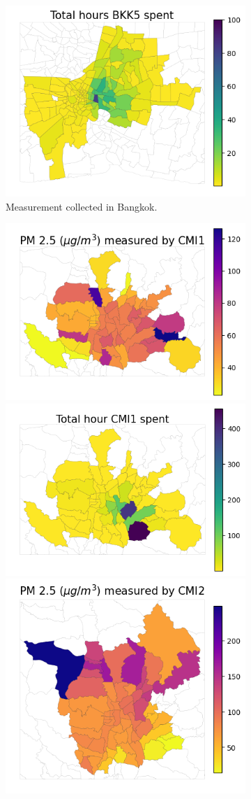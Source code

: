 \begin{figure}
\begin{subfigure}[t]{0.49\textwidth}
        \includegraphics[width=.5\linewidth]{figures/map/BKK5_time.png}
        \caption{Measurement collected in Bangkok.}
    \end{subfigure}%
    \hfill%
    \begin{subfigure}[t]{0.49\textwidth}
        \centering
        \includegraphics[width=.5\linewidth]{figures/map/CMI1_PM25.png}%
        \includegraphics[width=.5\linewidth]{figures/map/CMI1_time.png}
        \includegraphics[width=.5\linewidth]{figures/map/CMI2_PM25.png}%

\end{subfigure}
\end{figure}
